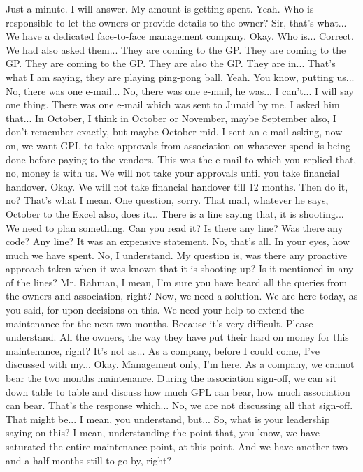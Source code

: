 Just a minute.
I will answer.
My amount is getting spent.
Yeah.
Who is responsible
to let the owners
or provide details to the owner?
Sir, that's what...
We have a dedicated
face-to-face management company.
Okay.
Who is...
Correct.
We had also asked them...
They are coming to the GP.
They are coming to the GP.
They are coming to the GP.
They are also the GP.
They are in...
That's what I am saying,
they are playing ping-pong ball.
Yeah.
You know, putting us...
No, there was one e-mail...
No, there was one e-mail,
he was...
I can't...
I will say one thing.
There was one e-mail
which was sent to Junaid by me.
I asked him that...
In October,
I think in October or November,
maybe September also,
I don't remember exactly,
but maybe October mid.
I sent an e-mail asking,
now on, we want GPL to take
approvals from association
on whatever spend is being done
before paying to the vendors.
This was the e-mail
to which you replied
that, no, money is with us.
We will not take your approvals
until you take financial handover.
Okay.
We will not take financial handover
till 12 months.
Then do it, no?
That's what I mean.
One question, sorry.
That mail, whatever he says,
October to the Excel also,
does it...
There is a line saying that,
it is shooting...
We need to plan something.
Can you read it?
Is there any line?
Was there any code?
Any line?
It was an expensive statement.
No, that's all.
In your eyes,
how much we have spent.
No, I understand.
My question is,
was there any proactive approach taken
when it was known that it is shooting up?
Is it mentioned in any of the lines?
Mr. Rahman,
I mean, I'm sure you have heard
all the queries from the
owners and association, right?
Now, we need a solution.
We are here today,
as you said, for upon decisions on this.
We need your help
to extend the maintenance
for the next two months.
Because it's very difficult.
Please understand.
All the owners,
the way they have put their hard
on money for this maintenance, right?
It's not as...
As a company,
before I could come,
I've discussed with my...
Okay.
Management only, I'm here.
As a company,
we cannot bear the two months
maintenance.
During the association sign-off,
we can sit down table to table
and discuss how much
GPL can bear,
how much association can bear.
That's the response which...
No,
we are not discussing
all that sign-off.
That might be...
I mean, you understand,
but...
So, what is your leadership
saying on this?
I mean, understanding
the point that, you know,
we have saturated
the entire maintenance point,
at this point.
And we have another
two and a half months
still to go by, right?
